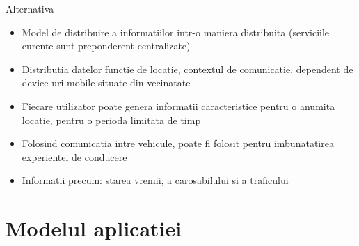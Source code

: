 \documentclass{beamer}
\begin{document}
\begin{frame}{Alternativa}
	\begin{itemize}
	  \item Model de distribuire a informatiilor intr-o maniera distribuita
	  (serviciile curente sunt preponderent centralizate)
	  \item Distributia datelor functie de locatie, contextul de comunicatie, 
	  dependent de device-uri mobile situate din vecinatate
	  \item Fiecare utilizator poate genera informatii caracteristice pentru o
	  anumita locatie, pentru o perioda limitata de timp
	  \item Folosind comunicatia intre vehicule, poate fi folosit pentru
	  imbunatatirea experientei de conducere
	  \item Informatii precum: starea vremii, a carosabilului si a traficului
	\end{itemize}
\end{frame}

\section{Modelul aplicatiei}
\end{document}
